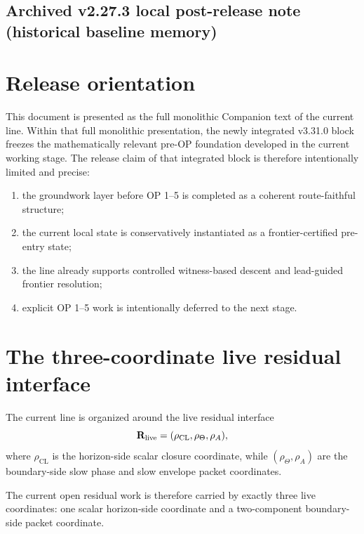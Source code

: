 \subsection*{Archived v2.27.3 local post-release note (historical baseline memory)}




\section{Release orientation}
This document is presented as the full monolithic Companion text of the current line. Within that full monolithic presentation, the newly integrated v3.31.0 block freezes the mathematically relevant pre-OP foundation developed in the current working stage. The release claim of that integrated block is therefore intentionally limited and precise:
\begin{enumerate}[leftmargin=2em]
  \item the groundwork layer before OP 1--5 is completed as a coherent route-faithful structure;
  \item the current local state is conservatively instantiated as a frontier-certified pre-entry state;
  \item the line already supports controlled witness-based descent and lead-guided frontier resolution;
  \item explicit OP 1--5 work is intentionally deferred to the next stage.
\end{enumerate}

\section{The three-coordinate live residual interface}
\begin{definition}\label{def:live-residual-interface}
The current line is organized around the live residual interface
\[
\mathbf{R}_{\mathrm{live}}=(\rho_{\mathrm{CL}},\rho_{\Theta},\rho_{A}),
\]
where $\rho_{\mathrm{CL}}$ is the horizon-side scalar closure coordinate, while $(\rho_{\Theta},\rho_{A})$ are the boundary-side slow phase and slow envelope packet coordinates.
\end{definition}

\begin{remark}
The current open residual work is therefore carried by exactly three live coordinates: one scalar horizon-side coordinate and a two-component boundary-side packet coordinate.
\end{remark}

